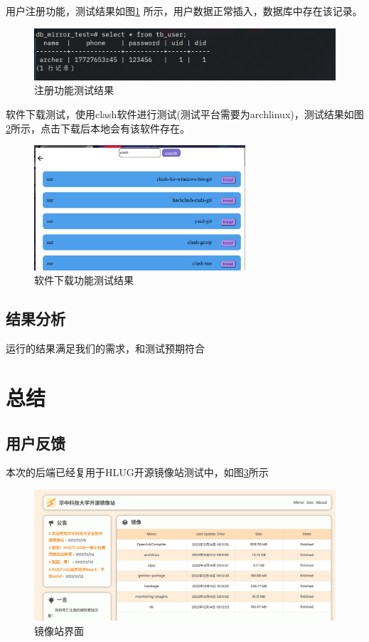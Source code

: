 \documentclass[supercite]{Experimental_Report}
\theoremstyle{definition}
\begin{document}
用户注册功能，测试结果如图\ref{signup-res} 所示，用户数据正常插入，数据库中存在该记录。
\begin{figure}[!h]
    \centering
    \includegraphics[width=1\textwidth]{./images/signup_res.png}
    \caption{注册功能测试结果}
    \label{signup-res}
\end{figure}
\nocite{*} %

%
%

软件下载测试，使用clash软件进行测试(测试平台需要为archlinux)，测试结果如图\ref{down-res}所示，点击下载后本地会有该软件存在。
\begin{figure}[!h]
    \centering
    \includegraphics[width=0.7\textwidth]{./images/clash.png}
    \caption{软件下载功能测试结果}
    \label{down-res}
\end{figure}

\subsection{结果分析}
运行的结果满足我们的需求，和测试预期符合

\section{总结}
\subsection{用户反馈}
本次的后端已经复用于HLUG开源镜像站测试中，如图\ref{front}所示

\begin{figure}[!h]
    \centering
    \includegraphics[width=1\textwidth]{./images/front.png}
    \caption{镜像站界面}
    \label{front}
\end{figure}
\end{document}
